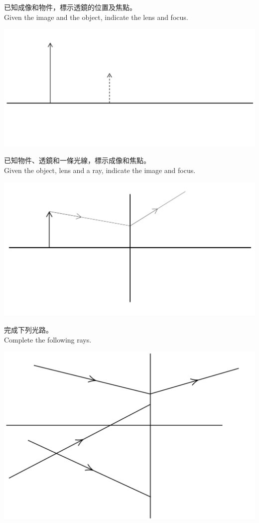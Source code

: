 \documentclass[class=exam, crop=false]{standalone}
\begin{document}
\begin{questions}
    \filbreak\question
    已知成像和物件，標示透鏡的位置及焦點。\\
    Given the image and the object, indicate the lens and focus.
    \par{\par\centering\includegraphics[width=.8\textwidth]{./img/ch45ex_2024-04-26-22-42-39.png}\par}

    \filbreak\question
    已知物件、透鏡和一條光線，標示成像和焦點。\\
    Given the object, lens and a ray, indicate the image and focus.
    \par{\par\centering\includegraphics[width=.7\textwidth]{./img/ch45ex_2024-04-26-22-43-49.png}\par}

    \filbreak\question
    完成下列光路。\\ Complete the following rays.
    \par{\par\centering\includegraphics[width=.8\textwidth]{./img/ch45ex_2024-04-26-22-44-43.png}\par}

\end{questions}
\end{document}

